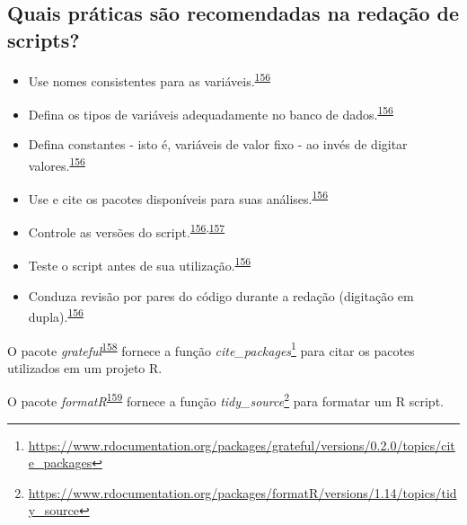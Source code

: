 \documentclass[
]{book}
\renewcommand{\href}[2]{#2\footnote{\url{#1}}}
\newenvironment{infobox}[1]
  {
  \begin{itemize}
  \renewcommand{\labelitemi}{
    \raisebox{-.7\height}[0pt][0pt]{
      {\setkeys{Gin}{width=3em,keepaspectratio}
        \texttt{[image: \#1]}}
    }
  }
  \setlength{\fboxsep}{1em}
  \begin{blackbox}
  \item
  }
  {
  \end{blackbox}
  \end{itemize}
  }
\begin{document}
\hypertarget{quais-pruxe1ticas-suxe3o-recomendadas-na-redauxe7uxe3o-de-scripts}{%
\subsection{Quais práticas são recomendadas na redação de scripts?}\label{quais-pruxe1ticas-suxe3o-recomendadas-na-redauxe7uxe3o-de-scripts}}

\begin{itemize}
\item
  Use nomes consistentes para as variáveis.\textsuperscript{\protect\hyperlink{ref-SchwabSimon2021}{156}}
\item
  Defina os tipos de variáveis adequadamente no banco de dados.\textsuperscript{\protect\hyperlink{ref-SchwabSimon2021}{156}}
\item
  Defina constantes - isto é, variáveis de valor fixo - ao invés de digitar valores.\textsuperscript{\protect\hyperlink{ref-SchwabSimon2021}{156}}
\item
  Use e cite os pacotes disponíveis para suas análises.\textsuperscript{\protect\hyperlink{ref-SchwabSimon2021}{156}}
\item
  Controle as versões do script.\textsuperscript{\protect\hyperlink{ref-SchwabSimon2021}{156},\protect\hyperlink{ref-Eglen2017}{157}}
\item
  Teste o script antes de sua utilização.\textsuperscript{\protect\hyperlink{ref-SchwabSimon2021}{156}}
\item
  Conduza revisão por pares do código durante a redação (digitação em dupla).\textsuperscript{\protect\hyperlink{ref-SchwabSimon2021}{156}}
\end{itemize}

\begin{infobox}{images/Rlogo}
O pacote \emph{grateful}\textsuperscript{\protect\hyperlink{ref-grateful}{158}} fornece a função \href{https://www.rdocumentation.org/packages/grateful/versions/0.2.0/topics/cite_packages}{\emph{cite\_packages}} para citar os pacotes utilizados em um projeto R.

\end{infobox}

\begin{infobox}{images/Rlogo}
O pacote \emph{formatR}\textsuperscript{\protect\hyperlink{ref-formatR}{159}} fornece a função \href{https://www.rdocumentation.org/packages/formatR/versions/1.14/topics/tidy_source}{\emph{tidy\_source}} para formatar um R script.

\end{infobox}
\end{document}
